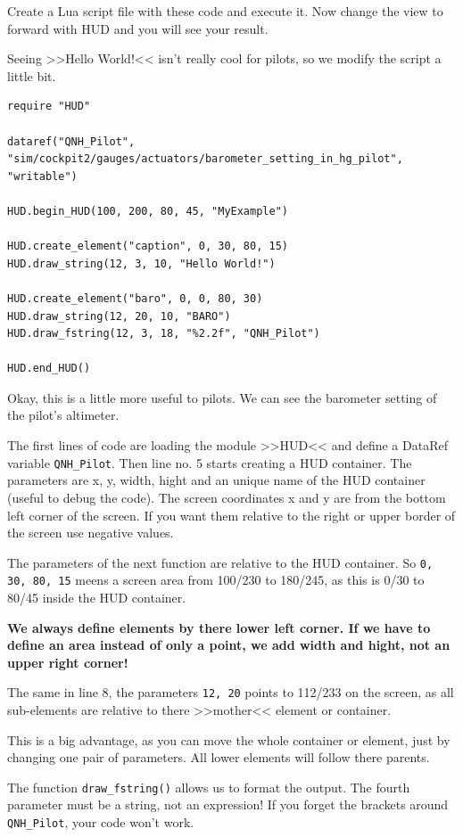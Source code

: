 \documentclass[11pt,parskip=half,a4paper]{scrartcl}
\begin{document}
Create a Lua script file with these code and execute it. Now change the view to forward with HUD and you will see your result.

Seeing >>Hello World!<< isn't really cool for pilots, so we modify the script a little bit.

\begin{lstlisting}[firstnumber=1]
require "HUD"

dataref("QNH_Pilot", "sim/cockpit2/gauges/actuators/barometer_setting_in_hg_pilot", "writable")

HUD.begin_HUD(100, 200, 80, 45, "MyExample")

HUD.create_element("caption", 0, 30, 80, 15)
HUD.draw_string(12, 3, 10, "Hello World!")

HUD.create_element("baro", 0, 0, 80, 30)
HUD.draw_string(12, 20, 10, "BARO")
HUD.draw_fstring(12, 3, 18, "%2.2f", "QNH_Pilot")

HUD.end_HUD()
\end{lstlisting}

Okay, this is a little more useful to pilots. We can see the barometer setting of the pilot's altimeter.

The first lines of code are loading the module >>HUD<< and define a DataRef variable \verb|QNH_Pilot|. Then line no. 5 starts creating a HUD container. The parameters are x, y, width, hight and an unique name of the HUD container (useful to debug the code). The screen coordinates x and y are from the bottom left corner of the screen. If you want them relative to the right or upper border of the screen use negative values.

The parameters of the next function are relative to the HUD container. So \verb|0, 30, 80, 15| meens a screen area from 100/230 to 180/245, as this is 0/30 to 80/45 inside the HUD container.

\textbf{We always define elements by there lower left corner. If we have to define an area instead of only a point, we add width and hight, not an upper right corner!}

The same in line 8, the parameters \verb|12, 20| points to 112/233 on the screen, as all sub-elements are relative to there >>mother<< element or container.

This is a big advantage, as you can move the whole container or element, just by changing one pair of parameters. All lower elements will follow there parents.

The function \verb|draw_fstring()| allows us to format the output. The fourth parameter must be a string, not an expression! If you forget the brackets around \verb|QNH_Pilot|, your code won't work.
\end{document}
